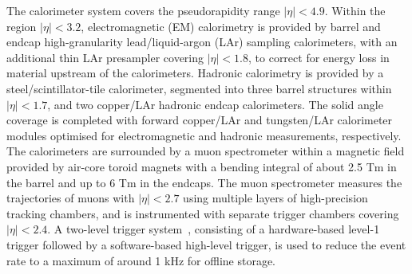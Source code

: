 The calorimeter system covers the pseudorapidity range $|\eta| < 4.9$.
Within the region $|\eta|< 3.2$, electromagnetic (EM) calorimetry is provided by barrel and 
endcap high-granularity lead/liquid-argon (LAr) sampling calorimeters,
with an additional thin LAr presampler covering $|\eta| < 1.8$,
to correct for energy loss in material upstream of the calorimeters.
Hadronic calorimetry is provided by %
a steel/scintillator-tile calorimeter,
segmented into three barrel structures within $|\eta| < 1.7$, and two copper/LAr hadronic endcap calorimeters.
The solid angle coverage is completed with forward copper/LAr and tungsten/LAr calorimeter modules
optimised for electromagnetic and hadronic measurements, respectively.
The calorimeters are surrounded by a muon spectrometer within a magnetic field provided by air-core toroid magnets 
with a bending integral of about 2.5 Tm in the barrel and up to 6 Tm in the endcaps. 
The muon spectrometer measures the trajectories of muons with $|\eta|<2.7$ using multiple layers of high-precision tracking chambers,
and is instrumented with separate trigger chambers covering $|\eta|<2.4$.
A two-level trigger system~\cite{Aaboud:2016leb}, consisting of a hardware-based level-1 trigger followed by 
a software-based high-level trigger, is used to reduce the event rate to a maximum of around 1 kHz for offline storage.
